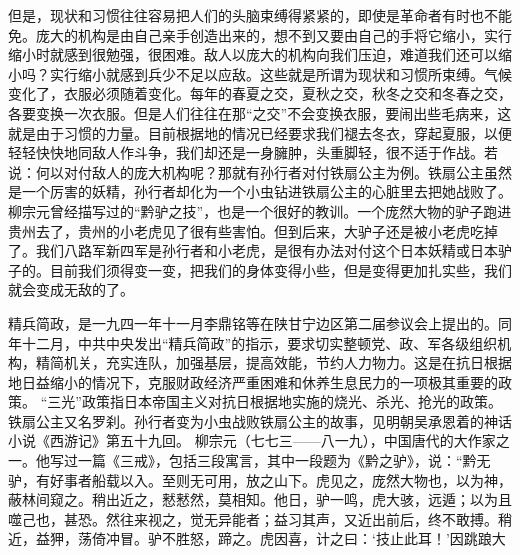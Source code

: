 但是，现状和习惯往往容易把人们的头脑束缚得紧紧的，即使是革命者有时也不能免。庞大的机构是由自己亲手创造出来的，想不到又要由自己的手将它缩小，实行缩小时就感到很勉强，很困难。敌人以庞大的机构向我们压迫，难道我们还可以缩小吗？实行缩小就感到兵少不足以应敌。这些就是所谓为现状和习惯所束缚。气候变化了，衣服必须随着变化。每年的春夏之交，夏秋之交，秋冬之交和冬春之交，各要变换一次衣服。但是人们往往在那“之交”不会变换衣服，要闹出些毛病来，这就是由于习惯的力量。目前根据地的情况已经要求我们褪去冬衣，穿起夏服，以便轻轻快快地同敌人作斗争，我们却还是一身臃肿，头重脚轻，很不适于作战。若说：何以对付敌人的庞大机构呢？那就有孙行者对付铁扇公主为例。铁扇公主虽然是一个厉害的妖精，孙行者却化为一个小虫钻进铁扇公主的心脏里去把她战败了。柳宗元曾经描写过的“黔驴之技”，也是一个很好的教训。一个庞然大物的驴子跑进贵州去了，贵州的小老虎见了很有些害怕。但到后来，大驴子还是被小老虎吃掉了。我们八路军新四军是孙行者和小老虎，是很有办法对付这个日本妖精或日本驴子的。目前我们须得变一变，把我们的身体变得小些，但是变得更加扎实些，我们就会变成无敌的了。


\begin{maonote}
精兵简政，是一九四一年十一月李鼎铭等在陕甘宁边区第二届参议会上提出的。同年十二月，中共中央发出“精兵简政”的指示，要求切实整顿党、政、军各级组织机构，精简机关，充实连队，加强基层，提高效能，节约人力物力。这是在抗日根据地日益缩小的情况下，克服财政经济严重困难和休养生息民力的一项极其重要的政策。
“三光”政策指日本帝国主义对抗日根据地实施的烧光、杀光、抢光的政策。
铁扇公主又名罗刹。孙行者变为小虫战败铁扇公主的故事，见明朝吴承恩着的神话小说《西游记》第五十九回。
柳宗元（七七三——八一九），中国唐代的大作家之一。他写过一篇《三戒》，包括三段寓言，其中一段题为《黔之驴》，说：“黔无驴，有好事者船载以入。至则无可用，放之山下。虎见之，庞然大物也，以为神，蔽林间窥之。稍出近之，慭慭然，莫相知。他日，驴一鸣，虎大骇，远遁；以为且噬己也，甚恐。然往来视之，觉无异能者；益习其声，又近出前后，终不敢搏。稍近，益狎，荡倚冲冒。驴不胜怒，蹄之。虎因喜，计之曰：‘技止此耳！’因跳踉大
\end{maonote}
